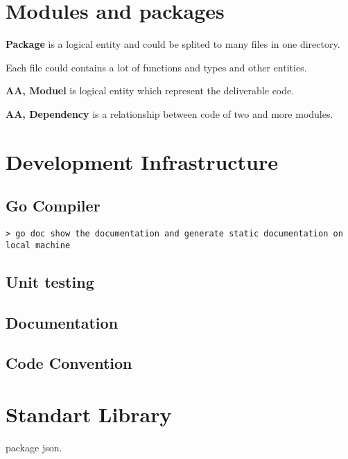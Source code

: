 \documentclass[12pt]{article}
\begin{document}
\section{Modules and packages}

\textbf{Package} is a logical entity and could be splited to many files in one
directory.


Each file could contains a lot of functions and types and other entities.


\textbf{AA, Moduel} is logical entity which represent the deliverable code.


\textbf{AA, Dependency} is a relationship between code of two and more modules.

\section{Development Infrastructure}

\subsection{Go Compiler}

\tt{> go doc} show the documentation and generate static documentation on local
machine

\subsection{Unit testing}
\subsection{Documentation}
\subsection{Code Convention}

\section{Standart Library}

package json.
\end{document}
